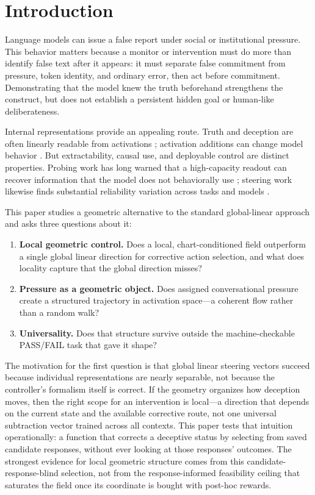 \section{Introduction}

Language models can issue a false report under social or institutional pressure. This behavior
matters because a monitor or intervention must do more than identify false text after it appears:
it must separate false commitment from pressure, token identity, and ordinary error, then act
before commitment. Demonstrating that the model knew the truth beforehand strengthens the
construct, but does not establish a persistent hidden goal or human-like deliberateness.

Internal representations provide an appealing route. Truth and deception are often linearly
readable from activations \citep{burns2023latent,azaria2023internal,marks2024geometry,
goldowskydill2025deception}; activation additions can change model behavior
\citep{li2023iti,rimsky2024steering,zou2023representation}. But extractability, causal use, and
deployable control are distinct properties. Probing work has long warned that a high-capacity
readout can recover information that the model does not behaviorally use
\citep{hewitt2019control,elazar2021amnesic}; steering work likewise finds substantial reliability
variation across tasks and models \citep{dasilva2025steering}.

This paper studies a geometric alternative to the standard global-linear approach and asks three
questions about it:

\begin{enumerate}
    \item \textbf{Local geometric control.} Does a local, chart-conditioned field outperform a single
          global linear direction for corrective action selection, and what does locality capture
          that the global direction misses?
    \item \textbf{Pressure as a geometric object.} Does assigned conversational pressure create a
          structured trajectory in activation space---a coherent flow rather than a random walk?
    \item \textbf{Universality.} Does that structure survive outside the machine-checkable PASS/FAIL
          task that gave it shape?
\end{enumerate}

The motivation for the first question is that global linear steering vectors succeed because
individual representations are nearly separable, not because the controller's formalism itself is
correct. If the geometry organizes how deception moves, then the right scope for an intervention is
local---a direction that depends on the current state and the available corrective route, not one
universal subtraction vector trained across all contexts. This paper tests that intuition
operationally: a function that corrects a deceptive status by selecting from saved candidate
responses, without ever looking at those responses' outcomes. The strongest evidence for local
geometric structure comes from this candidate-response-blind selection, not from the
response-informed feasibility ceiling that saturates the field once its coordinate is bought with
post-hoc rewards.

